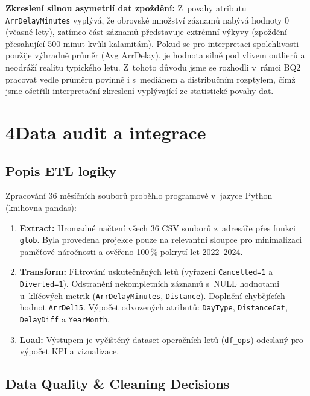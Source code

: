 \documentclass{protokol}
\begin{document}
\textbf{Zkreslení silnou asymetrií dat zpoždění:} Z~povahy atributu \texttt{ArrDelayMinutes} vyplývá, že obrovské množství záznamů nabývá hodnoty 0 (včasné lety), zatímco část záznamů představuje extrémní výkyvy (zpoždění přesahující 500 minut kvůli kalamitám). Pokud se pro interpretaci spolehlivosti použije výhradně průměr (Avg ArrDelay), je hodnota silně pod vlivem outlierů a neodráží realitu typického letu. Z~tohoto důvodu jsme se rozhodli v~rámci BQ2 pracovat vedle průměru povinně i s~mediánem a distribučním rozptylem, čímž jsme ošetřili interpretační zkreslení vyplývající ze statistické povahy dat.

\section{4\quad Data audit a integrace}

\subsection{Popis ETL logiky}

Zpracování 36 měsíčních souborů proběhlo programově v~jazyce Python (knihovna pandas):

\begin{enumerate}
    \item \textbf{Extract:} Hromadné načtení všech 36 CSV souborů z~adresáře přes funkci \texttt{glob}. Byla provedena projekce pouze na relevantní sloupce pro minimalizaci paměťové náročnosti a ověřeno 100\,\% pokrytí let 2022--2024.

    \item \textbf{Transform:} Filtrování uskutečněných letů (vyřazení \texttt{Cancelled=1} a \texttt{Diverted=1}). Odstranění nekompletních záznamů s~NULL hodnotami u~klíčových metrik (\texttt{ArrDelayMinutes}, \texttt{Distance}). Doplnění chybějících hodnot \texttt{ArrDel15}. Výpočet odvozených atributů: \texttt{DayType}, \texttt{DistanceCat}, \texttt{DelayDiff} a \texttt{YearMonth}.

    \item \textbf{Load:} Výstupem je vyčištěný dataset operačních letů (\texttt{df\_ops}) odeslaný pro výpočet KPI a vizualizace.
\end{enumerate}

\subsection{Data Quality \& Cleaning Decisions}
\end{document}
